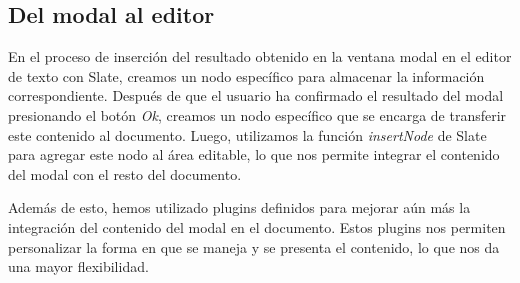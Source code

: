 \subsection{Del modal al editor}
En el proceso de inserción del resultado obtenido en la ventana modal en el editor de texto con Slate, creamos un nodo específico para almacenar la información correspondiente. Después de que el usuario ha confirmado el resultado del modal presionando el botón \textit{Ok}, creamos un nodo específico que se encarga de transferir este contenido al documento. Luego, utilizamos la función \textit{insertNode} de Slate para agregar este nodo al área editable, lo que nos permite integrar el contenido del modal con el resto del documento.

Además de esto, hemos utilizado plugins definidos para mejorar aún más la integración del contenido del modal en el documento. Estos plugins nos permiten personalizar la forma en que se maneja y se presenta el contenido, lo que nos da una mayor flexibilidad.

